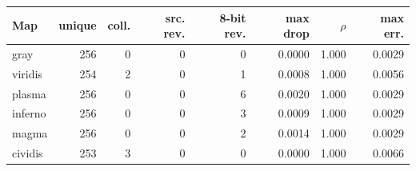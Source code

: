 \begin{tabular}{lrrrrrrr}
\toprule
Map & unique & coll. & src. rev. & 8-bit rev. & max drop & $\rho$ & max err. \\
\midrule
gray & 256 & 0 & 0 & 0 & 0.0000 & 1.000 & 0.0029 \\
viridis & 254 & 2 & 0 & 1 & 0.0008 & 1.000 & 0.0056 \\
plasma & 256 & 0 & 0 & 6 & 0.0020 & 1.000 & 0.0029 \\
inferno & 256 & 0 & 0 & 3 & 0.0009 & 1.000 & 0.0029 \\
magma & 256 & 0 & 0 & 2 & 0.0014 & 1.000 & 0.0029 \\
cividis & 253 & 3 & 0 & 0 & 0.0000 & 1.000 & 0.0066 \\
\bottomrule
\end{tabular}
